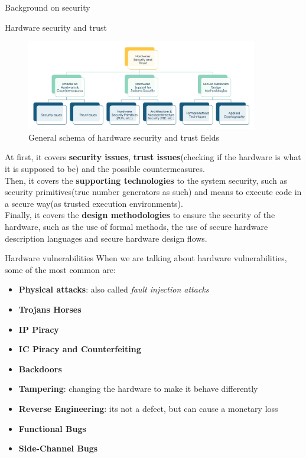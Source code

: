 \begin{section}{Background on security}
\begin{subsection}{Hardware security and trust}
    \begin{figure}[h]
      \centering
      \includegraphics[width=0.9\textwidth]{img/hardware/hardware security schema.png}
      \caption{General schema of hardware security and trust fields}
      \label{fig:hardware security fields}
    \end{figure}
    At first, it covers \textbf{security issues}, \textbf{trust issues}(checking if the hardware
    is what it is supposed to be) and the possible countermeasures.\\
    Then, it covers the \textbf{supporting technologies} to the system security, such as security
    primitives(true number generators as such) and means to execute code in a secure way(as trusted
    execution environments).\\
    Finally, it covers the \textbf{design methodologies} to ensure the security of the hardware, such
    as the use of formal methods, the use of secure hardware description languages and secure hardware design flows.
  \end{subsection}
\end{section}
\begin{section}{Hardware vulnerabilities}
  When we are talking about hardware vulnerabilities, some of the most common are:
  \begin{itemize}
    \item \textbf{Physical attacks}: also called \textit{fault injection attacks}
    \item \textbf{Trojans Horses}
    \item \textbf{IP Piracy}
    \item \textbf{IC Piracy and Counterfeiting}
    \item \textbf{Backdoors}
    \item \textbf{Tampering}: changing the hardware to make it behave differently
    \item \textbf{Reverse Engineering}: its not a defect, but can cause a monetary loss
    \item \textbf{Functional Bugs}
    \item \textbf{Side-Channel Bugs}
  \end{itemize}
\end{section}
